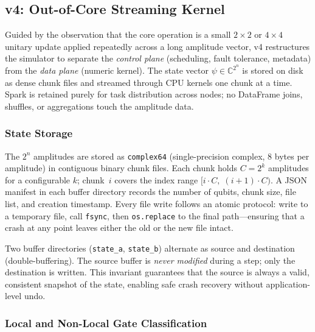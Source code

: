\subsection{v4: Out-of-Core Streaming Kernel}
\label{sec:v4}

Guided by the observation that the core operation is a small
$2\!\times\!2$ or $4\!\times\!4$ unitary update applied repeatedly
across a long amplitude vector, v4 restructures the simulator to
separate the \emph{control plane} (scheduling, fault tolerance,
metadata) from the \emph{data plane} (numeric kernel).
The state vector $\psi \in \mathbb{C}^{2^n}$ is stored on disk as
dense chunk files and streamed through CPU kernels one chunk at a time.
Spark is retained purely for task distribution across nodes; no
DataFrame joins, shuffles, or aggregations touch the amplitude data.

\subsubsection{State Storage}
\label{sec:storage}

The $2^n$ amplitudes are stored as \texttt{complex64} (single-precision
complex, 8 bytes per amplitude) in contiguous binary chunk files.
Each chunk holds $C = 2^k$ amplitudes for a configurable $k$; chunk~$i$
covers the index range $[i \cdot C,\;(i{+}1) \cdot C)$. A JSON manifest
in each buffer directory records the number of qubits, chunk size, file
list, and creation timestamp. Every file write follows an atomic
protocol: write to a temporary file, call \texttt{fsync}, then
\texttt{os.replace} to the final path---ensuring that a crash at any
point leaves either the old or the new file intact.

Two buffer directories (\texttt{state\_a}, \texttt{state\_b}) alternate
as source and destination (double-buffering). The source buffer is
\emph{never modified} during a step; only the destination is written.
This invariant guarantees that the source is always a valid, consistent
snapshot of the state, enabling safe crash recovery without
application-level undo.

\subsubsection{Local and Non-Local Gate Classification}
\label{sec:local-nonlocal}

